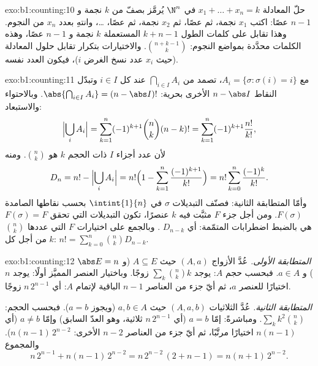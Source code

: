 \begin{solution}{exo:b1:counting:10}
حلّ المعادلة $x_1 + \dots + x_n = k$ في $\N^n$ يُرمَّز بصفّ من
$k$ نجمة و $n - 1$ عصًا: اكتب $x_1$ نجمة، ثم عصًا، ثم $x_2$ نجمة، ثم
عصًا، \dots، وانتهِ بعدد $x_n$ من النجوم. وهذا تقابل على
كلمات الطول $k + n - 1$ المستعملة $k$ نجمة و $n - 1$ عصًا، وهذه
الكلمات محدَّدة بمواضع النجوم:
$\binom{n + k - 1}{k}$. والاختيارات بتكرار تقابل
حلول المعادلة (حيث $x_i$ عدد نسخ الغرض $i$)، فيكون العدد
نفسه.
\end{solution}

\begin{solution}{exo:b1:counting:11}
مع $A_i = \{\sigma : \sigma(i) = i\}$، تصمد  من
$\bigcap_{i \in I} A_i$ عند كل $i \in I$ وتبدّل النقاط
$n - \abs I$ الأخرى بحرية: $\abs{\bigcap_{i \in I} A_i} =
(n - \abs I)!$. وبالاحتواء والاستبعاد:
\[
\Bigl|\bigcup_i A_i\Bigr|
= \sum_{k=1}^{n} (-1)^{k+1} \binom nk (n-k)!
= \sum_{k=1}^{n} (-1)^{k+1} \frac{n!}{k!} ,
\]
لأن عدد أجزاء $I$ ذات الحجم $k$ هو $\binom nk$. ومنه
\[
D_n = n! - \Bigl|\bigcup_i A_i\Bigr|
= n!\Bigl(1 - \sum_{k=1}^{n} \frac{(-1)^{k+1}}{k!}\Bigr)
= n! \sum_{k=0}^{n} \frac{(-1)^k}{k!} .
\]
وأمّا المتطابقة الثانية: فصنّف التبديلات $\sigma$ في
$\intint{1}{n}$ بحسب  نقاطها الصامدة $F(\sigma)$. ومن أجل جزء
$F$ مثبَّت فيه $k$ عنصرًا، تكون التبديلات التي تحقق $F(\sigma) = F$ هي
بالضبط اضطرابات المتمّمة: أي $D_{n-k}$ . وبالجمع على
اختيارات $F$ التي عددها $\binom nk$ من أجل كل $k$:
$n! = \sum_{k=0}^{n} \binom nk D_{n-k}$.
\end{solution}

\begin{solution}{exo:b1:counting:12}
\emph{المتطابقة الأولى.} عُدَّ الأزواج $(A, a)$ حيث $A \subseteq E$
(و $\abs E = n$) و $a \in A$. فبحسب حجم $A$: يوجد $\sum_k \binom nk k$
زوجًا. وباختيار العنصر المميَّز أولًا: يوجد $n$ اختيارًا للعنصر $a$، ثم
أيّ جزء من العناصر $n - 1$ الباقية لإتمام $A$:
أي $n\,2^{n-1}$ زوجًا.

\emph{المتطابقة الثانية.} عُدَّ الثلاثيات $(A, a, b)$ حيث $a, b \in
A$ (ويجوز $a = b$). فبحسب الحجم: $\sum_k k^2 \binom nk$. ومباشرةً:
إمّا $a = b$ (أي $n\,2^{n-1}$ ثلاثية، وهو العدّ السابق) وإمّا $a \neq b$
(أي $n(n-1)$ اختيارًا مرتَّبًا، ثم أيّ جزء من العناصر $n - 2$
الأخرى: $n(n-1)\,2^{n-2}$). والمجموع
\[
n\,2^{n-1} + n(n-1)\,2^{n-2} = n\,2^{n-2}\,(2 + n - 1)
= n(n+1)\,2^{n-2} .
\]
\end{solution}

